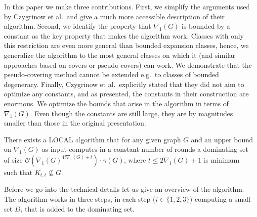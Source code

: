 In this paper we make three contributions. First, we simplify the
arguments used by Czygrinow et al.\ and give a much more accessible
description of their algorithm. Second, we identify the property that $\nabla_1(G)$ is
bounded by a constant as the key property that makes the algorithm
work. Classes with only this restriction are
even more general than bounded expansion classes, hence, we generalize
the algorithm to the most general classes on which it (and similar
approaches based on covers or pseudo-covers)
can work. We demonstrate that the pseudo-covering method cannot
be extended e.g.\ to classes of bounded degeneracy. Finally,
Czygrinow et al.\ explicitly stated that they did not aim to
optimize any constants, and as presented, the constants in their
construction are enormous. We optimize the bounds that arise in
the algorithm in terms of $\nabla_1(G)$.
Even though the constants
are still large, they are by magnitudes smaller than those in the
original presentation.

\begin{theorem}
There exists a LOCAL algorithm that for any given graph $G$ and
an upper bound on $\nabla_1(G)$ as input
computes in a constant number of rounds a dominating set
of size $\mathcal{O}(\nabla_1(G)^{4t\nabla_1(G)+t})\cdot \gamma(G)$,
where $t\leq 2\nabla_1(G)+1$ is minimum such that $K_{t,t}\not\subseteq G$.
\end{theorem}

\pagebreak
Before we go into the technical details let us give an overview of the
algorithm. The algorithm works in three steps, in each step ($i\in \{1,2,3\}$) computing a small set $D_i$ that is added to the dominating set.

